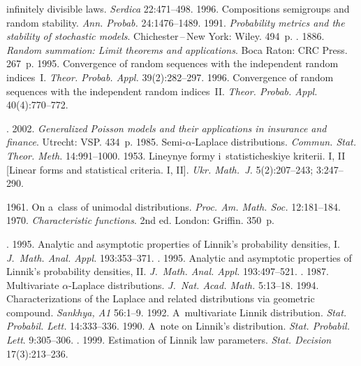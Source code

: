 \begin{multicols}{2}
{{\begin{thebibliography}{99}
infinitely divisible laws. \textit{Serdica} 22:471--498. 
 1996. Compositions semigroups and random stability. 
\textit{Ann. Probab.} 24:1476--1489. 
 1991. \textit{Probability metrics and the stability of stochastic 
models}. Chichester\,--\,New York: Wiley. 494~p.
. 1886. \textit{Random 
summation: Limit theorems and applications}. Boca Raton: CRC Press. 267~p.
 1995. 
Convergence of random sequences with the independent random 
indices~I. \textit{Theor. Probab. Appl.} 39(2):282--297. 
 1996. Convergence of random sequences with the independent random 
indices~II. \textit{Theor. Probab. Appl.} 40(4):770--772. 

. 2002. 
\textit{Generalized Poisson models and their applications in insurance and finance}. 
Utrecht: VSP. 434~p.
 1985. Semi-$\alpha$-Laplace distributions.
\textit{Commun. Stat. Theor. Meth.} 14:991--1000. 
 1953. Lineynye formy i~statisticheskiye kriterii. I, II 
[Linear forms and statistical criteria. I, II]. 
\textit{Ukr. Math.~J.} 5(2):207--243; 3:247--290. 


 1961. On a~class of unimodal distributions. 
\textit{Proc. Am. Math. Soc.} 12:181--184. 
 1970. \textit{Characteristic functions}. 2nd ed. 
London: Griffin. 350~p. 

. 1995. 
Analytic and asymptotic properties of Linnik's probability densities, I. 
\textit{J.~Math. Anal. Appl.} 193:353--371. 
. 1995. 
Analytic and asymptotic properties of Linnik's probability densities, II. 
\textit{J.~Math. Anal. Appl.} 193:497--521. 
. 1987. Multivariate $\alpha$-Laplace distributions. 
\textit{J.~Nat. Acad. Math.} 5:13--18. 
 1994. Characterizations of the Laplace and related distributions 
via geometric compound. \textit{Sankhya, A1} 56:1--9. 
 1992. A~multivariate Linnik distribution. 
\textit{Stat. Probabil. Lett.} 14:333--336. 
 1990. A~note on Linnik's distribution. 
\textit{Stat. Probabil. Lett}. 9:305--306. 
. 
1999. Estimation of Linnik law parameters. \textit{Stat. Decision} 17(3):213--236. 


\end{thebibliography}}}
\end{multicols}
